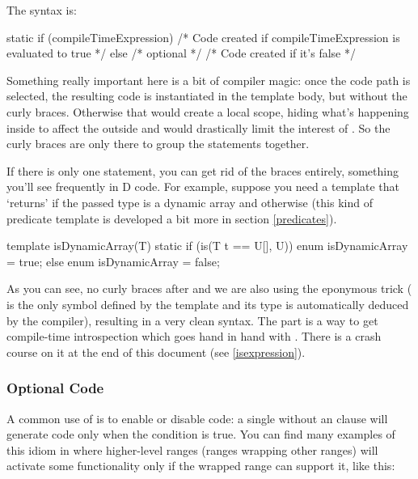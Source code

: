 The syntax is:
\begin{dcode}
static if (compileTimeExpression)
{
     /* Code created if compileTimeExpression is evaluated to true */
}
else /* optional */
{
     /* Code created if it's false */
}
\end{dcode}

Something really important here is a bit of compiler magic: once the code path is selected, the resulting code is instantiated in the template body, but without the curly braces. Otherwise that would create a local scope, hiding what's happening inside to affect the outside and would drastically limit the interest of . So the curly braces are only there to group the statements together. 

If there is only one statement, you can get rid of the braces entirely, something you'll see frequently in D code. For example, suppose you need a template that `returns'  if the passed type is a dynamic array and  otherwise (this kind of predicate template is developed a bit more in section \ref{predicates}).

\begin{dcode}
template isDynamicArray(T)
{
    static if (is(T t == U[], U))
        enum isDynamicArray = true;
    else
        enum isDynamicArray = false;
}
\end{dcode}

As you can see, no curly braces after  and we are also using the eponymous trick ( is the only symbol defined by the template and its type is automatically deduced by the compiler), resulting in a very clean syntax. The \DD{()} part is a way to get compile-time introspection which goes hand in hand with . There is a crash course on it at the end of this document (see \autoref{isexpression}).

\subsubsection{Optional Code}

A common use of  is to enable or disable code: a single  without an  clause will generate code only when the condition is true. You can find many examples of this idiom in  where higher-level ranges (ranges wrapping other ranges) will activate some functionality only if the wrapped range can support it, like this:


